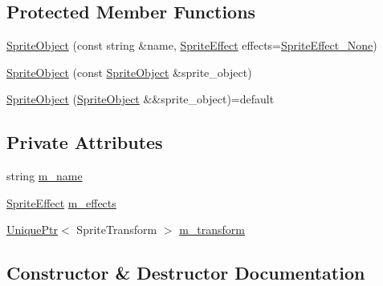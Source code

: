 \subsection*{Protected Member Functions}
\begin{DoxyCompactItemize}
\item 
\hyperlink{classmage_1_1_sprite_object_a1d487cfddfd6e3f60047f9316522ba8b}{Sprite\+Object} (const string \&name, \hyperlink{namespacemage_a9cfe18123066ba4236f548f9de75d881}{Sprite\+Effect} effects=\hyperlink{namespacemage_a9cfe18123066ba4236f548f9de75d881af3c275fbfacfe174da928b2f24dfa515}{Sprite\+Effect\+\_\+\+None})
\item 
\hyperlink{classmage_1_1_sprite_object_ac75871029cd740aeb0dd3e23d037b703}{Sprite\+Object} (const \hyperlink{classmage_1_1_sprite_object}{Sprite\+Object} \&sprite\+\_\+object)
\item 
\hyperlink{classmage_1_1_sprite_object_ab4207c10cd0324cec9a278cd1dac5c46}{Sprite\+Object} (\hyperlink{classmage_1_1_sprite_object}{Sprite\+Object} \&\&sprite\+\_\+object)=default
\end{DoxyCompactItemize}
\subsection*{Private Attributes}
\begin{DoxyCompactItemize}
\item 
string \hyperlink{classmage_1_1_sprite_object_a6f2a859e40ed391909bb4c87a8b74480}{m\+\_\+name}
\item 
\hyperlink{namespacemage_a9cfe18123066ba4236f548f9de75d881}{Sprite\+Effect} \hyperlink{classmage_1_1_sprite_object_a270f73b8d316f72c4228854d08a6d2ea}{m\+\_\+effects}
\item 
\hyperlink{namespacemage_a8c307fbcc33bce9b7f2aa4c26c3b95cf}{Unique\+Ptr}$<$ Sprite\+Transform $>$ \hyperlink{classmage_1_1_sprite_object_a9523ae6f081a8fde3cbb3558f6e327da}{m\+\_\+transform}
\end{DoxyCompactItemize}


\subsection{Constructor \& Destructor Documentation}
\hypertarget{classmage_1_1_sprite_object_a88c02e6af2ab79389de368dd9ba32930}{}\label{classmage_1_1_sprite_object_a88c02e6af2ab79389de368dd9ba32930} 
